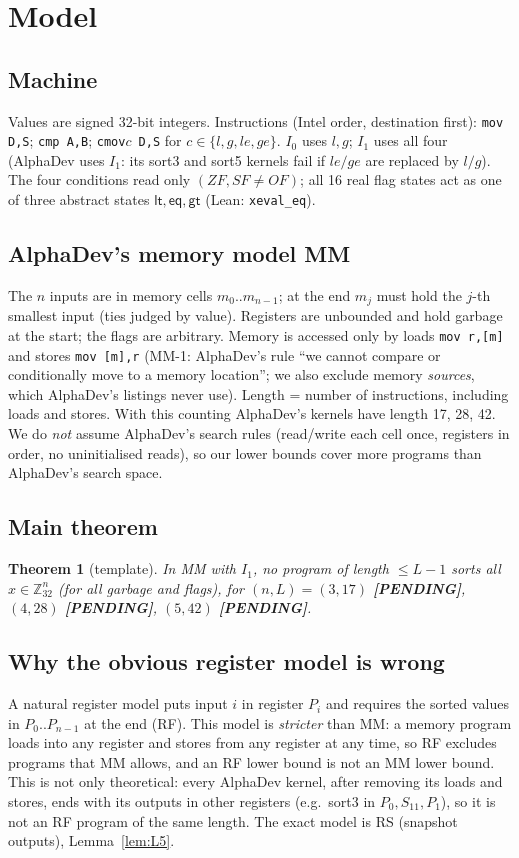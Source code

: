 \documentclass[11pt]{article}
\newtheorem{theorem}{Theorem}\newtheorem{lemma}[theorem]{Lemma}\newtheorem{corollary}[theorem]{Corollary}
\theoremstyle{remark}\newtheorem{remark}[theorem]{Remark}
\newcommand{\pending}{\textbf{[PENDING]}}
\begin{document}
\section{Model}\label{sec:model}
\subsection{Machine}
Values are signed 32-bit integers. Instructions (Intel order, destination first): \texttt{mov D,S}; \texttt{cmp A,B};
\texttt{cmov}$c$\texttt{ D,S} for $c \in \{l, g, le, ge\}$. $I_0$ uses $l, g$; $I_1$ uses all four (AlphaDev uses $I_1$:
its sort3 and sort5 kernels fail if $le/ge$ are replaced by $l/g$). The four conditions read only $(ZF, SF\neq OF)$; all 16
real flag states act as one of three abstract states $\mathsf{lt},\mathsf{eq},\mathsf{gt}$ (Lean: \texttt{xeval\_eq}).

\subsection{AlphaDev's memory model MM}
The $n$ inputs are in memory cells $m_0..m_{n-1}$; at the end $m_j$ must hold the $j$-th smallest input (ties judged by value).
Registers are unbounded and hold garbage at the start; the flags are arbitrary. Memory is accessed only by loads
\texttt{mov r,[m]} and stores \texttt{mov [m],r} (MM-1: AlphaDev's rule ``we cannot compare or conditionally move to a memory
location''; we also exclude memory \emph{sources}, which AlphaDev's listings never use). Length = number of instructions,
including loads and stores. With this counting AlphaDev's kernels have length 17, 28, 42.
We do \emph{not} assume AlphaDev's search rules (read/write each cell once, registers in order, no uninitialised reads),
so our lower bounds cover more programs than AlphaDev's search space.

\subsection{Main theorem}
\begin{theorem}[template]\label{thm:main}
In MM with $I_1$, no program of length $\le L-1$ sorts all $x \in \mathbb{Z}_{32}^n$ (for all garbage and flags), for
$(n, L) = (3, 17)$ \pending, $(4, 28)$ \pending, $(5, 42)$ \pending.
\end{theorem}

\subsection{Why the obvious register model is wrong}
A natural register model puts input $i$ in register $P_i$ and requires the sorted values in $P_0..P_{n-1}$ at the end (RF).
This model is \emph{stricter} than MM: a memory program loads into any register and stores from any register at any time,
so RF excludes programs that MM allows, and an RF lower bound is not an MM lower bound. This is not only theoretical: every
AlphaDev kernel, after removing its loads and stores, ends with its outputs in other registers (e.g.\ sort3 in
$P_0, S_{11}, P_1$), so it is not an RF program of the same length. The exact model is RS (snapshot outputs), Lemma~\ref{lem:L5}.
\end{document}
